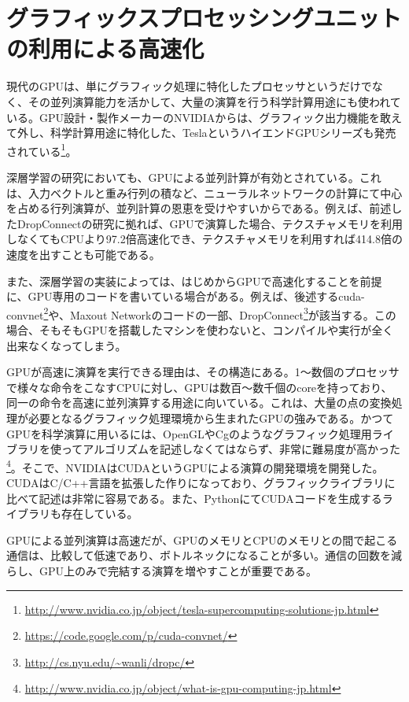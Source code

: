 \section{グラフィックスプロセッシングユニットの利用による高速化}
現代のGPUは、単にグラフィック処理に特化したプロセッサというだけでなく、その並列演算能力を活かして、大量の演算を行う科学計算用途にも使われている。GPU設計・製作メーカーのNVIDIAからは、グラフィック出力機能を敢えて外し、科学計算用途に特化した、TeslaというハイエンドGPUシリーズも発売されている\footnote{\url{http://www.nvidia.co.jp/object/tesla-supercomputing-solutions-jp.html}}。\par 
深層学習の研究においても、GPUによる並列計算が有効とされている。これは、入力ベクトルと重み行列の積など、ニューラルネットワークの計算にて中心を占める行列演算が、並列計算の恩恵を受けやすいからである\cite{bengio2012practical}。例えば、前述したDropConnectの研究\cite{wan2013regularization}に拠れば、GPUで演算した場合、テクスチャメモリを利用しなくてもCPUより97.2倍高速化でき、テクスチャメモリを利用すれば414.8倍の速度を出すことも可能である。\par
また、深層学習の実装によっては、はじめからGPUで高速化することを前提に、GPU専用のコードを書いている場合がある。例えば、後述するcuda-convnet\footnote{\url{https://code.google.com/p/cuda-convnet/}}や、Maxout Network\cite{goodfellow2013maxout}のコードの一部、DropConnect\cite{wan2013regularization}\footnote{\url{http://cs.nyu.edu/~wanli/dropc/}}が該当する。この場合、そもそもGPUを搭載したマシンを使わないと、コンパイルや実行が全く出来なくなってしまう。\par
GPUが高速に演算を実行できる理由は、その構造にある。1〜数個のプロセッサで様々な命令をこなすCPUに対し、GPUは数百〜数千個のcoreを持っており、同一の命令を高速に並列演算する用途に向いている。これは、大量の点の変換処理が必要となるグラフィック処理環境から生まれたGPUの強みである。かつてGPUを科学演算に用いるには、OpenGLやCgのようなグラフィック処理用ライブラリを使ってアルゴリズムを記述しなくてはならず、非常に難易度が高かった\footnote{\url{http://www.nvidia.co.jp/object/what-is-gpu-computing-jp.html}}。そこで、NVIDIAはCUDAというGPUによる演算の開発環境を開発した\cite{garland2008parallel}。CUDAはC/C++言語を拡張した作りになっており、グラフィックライブラリに比べて記述は非常に容易である。また、PythonにてCUDAコードを生成するライブラリも存在している\cite{klockner2009pycuda:}\cite{klockner2012pycuda}。\par
GPUによる並列演算は高速だが、GPUのメモリとCPUのメモリとの間で起こる通信は、比較して低速であり、ボトルネックになることが多い。通信の回数を減らし、GPU上のみで完結する演算を増やすことが重要である\cite{bengio2012practical}。



